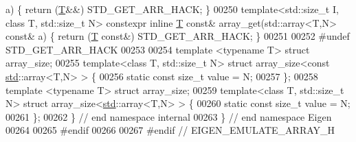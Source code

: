 \begin{DoxyCode}
       a) \{ \textcolor{keywordflow}{return} (\hyperlink{group___sparse_core___module_class_eigen_1_1_triplet}{T}&&)      STD\_GET\_ARR\_HACK; \}
00250 \textcolor{keyword}{template}<std::\textcolor{keywordtype}{size\_t} I, \textcolor{keyword}{class} T, std::\textcolor{keywordtype}{size\_t} N> constexpr \textcolor{keyword}{inline} \hyperlink{group___sparse_core___module_class_eigen_1_1_triplet}{T} \textcolor{keyword}{const}& array\_get(std::array<T,N> \textcolor{keyword}{const}&
       a) \{ \textcolor{keywordflow}{return} (\hyperlink{group___sparse_core___module_class_eigen_1_1_triplet}{T} \textcolor{keyword}{const}&) STD\_GET\_ARR\_HACK; \}
00251 
00252 \textcolor{preprocessor}{#undef STD\_GET\_ARR\_HACK}
00253 
00254 \textcolor{keyword}{template} <\textcolor{keyword}{typename} T> \textcolor{keyword}{struct }array\_size;
00255 \textcolor{keyword}{template}<\textcolor{keyword}{class} T, std::\textcolor{keywordtype}{size\_t} N> \textcolor{keyword}{struct }array\_size<const \hyperlink{namespacestd}{std}::array<T,N> > \{
00256   \textcolor{keyword}{static} \textcolor{keyword}{const} \textcolor{keywordtype}{size\_t} value = N;
00257 \};
00258 \textcolor{keyword}{template} <\textcolor{keyword}{typename} T> \textcolor{keyword}{struct }array\_size;
00259 \textcolor{keyword}{template}<\textcolor{keyword}{class} T, std::\textcolor{keywordtype}{size\_t} N> \textcolor{keyword}{struct }array\_size<\hyperlink{namespacestd}{std}::array<T,N> > \{
00260   \textcolor{keyword}{static} \textcolor{keyword}{const} \textcolor{keywordtype}{size\_t} value = N;
00261 \};
00262 \}  \textcolor{comment}{// end namespace internal}
00263 \}  \textcolor{comment}{// end namespace Eigen}
00264 
00265 \textcolor{preprocessor}{#endif}
00266 
00267 \textcolor{preprocessor}{#endif  // EIGEN\_EMULATE\_ARRAY\_H}
\end{DoxyCode}
